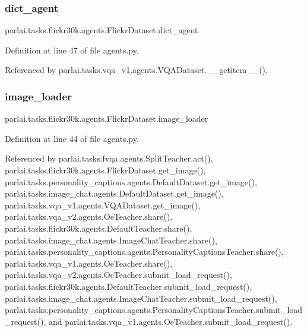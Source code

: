 \subsubsection{\texorpdfstring{dict\+\_\+agent}{dict\_agent}}
{\footnotesize\ttfamily parlai.\+tasks.\+flickr30k.\+agents.\+Flickr\+Dataset.\+dict\+\_\+agent}



Definition at line 47 of file agents.\+py.



Referenced by parlai.\+tasks.\+vqa\+\_\+v1.\+agents.\+V\+Q\+A\+Dataset.\+\_\+\+\_\+getitem\+\_\+\+\_\+().

\mbox{\label{classparlai_1_1tasks_1_1flickr30k_1_1agents_1_1FlickrDataset_a49701d32271d4804b933a96f80133f8a}} 
\subsubsection{\texorpdfstring{image\+\_\+loader}{image\_loader}}
{\footnotesize\ttfamily parlai.\+tasks.\+flickr30k.\+agents.\+Flickr\+Dataset.\+image\+\_\+loader}



Definition at line 44 of file agents.\+py.



Referenced by parlai.\+tasks.\+fvqa.\+agents.\+Split\+Teacher.\+act(), parlai.\+tasks.\+flickr30k.\+agents.\+Flickr\+Dataset.\+get\+\_\+image(), parlai.\+tasks.\+personality\+\_\+captions.\+agents.\+Default\+Dataset.\+get\+\_\+image(), parlai.\+tasks.\+image\+\_\+chat.\+agents.\+Default\+Dataset.\+get\+\_\+image(), parlai.\+tasks.\+vqa\+\_\+v1.\+agents.\+V\+Q\+A\+Dataset.\+get\+\_\+image(), parlai.\+tasks.\+vqa\+\_\+v2.\+agents.\+Oe\+Teacher.\+share(), parlai.\+tasks.\+flickr30k.\+agents.\+Default\+Teacher.\+share(), parlai.\+tasks.\+image\+\_\+chat.\+agents.\+Image\+Chat\+Teacher.\+share(), parlai.\+tasks.\+personality\+\_\+captions.\+agents.\+Personality\+Captions\+Teacher.\+share(), parlai.\+tasks.\+vqa\+\_\+v1.\+agents.\+Oe\+Teacher.\+share(), parlai.\+tasks.\+vqa\+\_\+v2.\+agents.\+Oe\+Teacher.\+submit\+\_\+load\+\_\+request(), parlai.\+tasks.\+flickr30k.\+agents.\+Default\+Teacher.\+submit\+\_\+load\+\_\+request(), parlai.\+tasks.\+image\+\_\+chat.\+agents.\+Image\+Chat\+Teacher.\+submit\+\_\+load\+\_\+request(), parlai.\+tasks.\+personality\+\_\+captions.\+agents.\+Personality\+Captions\+Teacher.\+submit\+\_\+load\+\_\+request(), and parlai.\+tasks.\+vqa\+\_\+v1.\+agents.\+Oe\+Teacher.\+submit\+\_\+load\+\_\+request().

